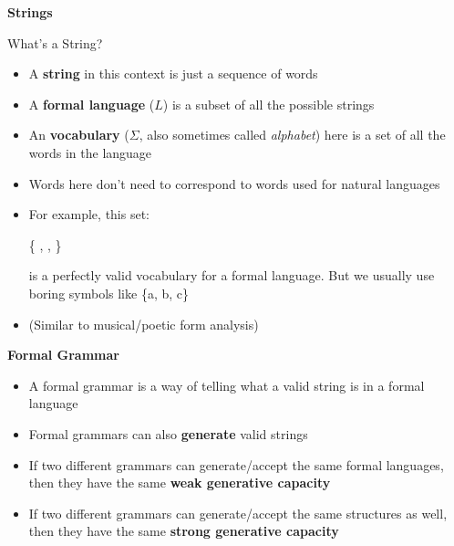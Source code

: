 \documentclass{beamer}
\newcommand{\pagestepalt}[2]{
  \begin{frame}[t]
    \begin{minipage}[t][0.26\textheight][t]{\textwidth}
      \begin{center}
        \huge
        \textbf{#1}
      \end{center}
    \end{minipage}
    
    \begin{minipage}[t][0.7\textheight][c]{\textwidth}
      #2
    \end{minipage}
  \end{frame}
}
\begin{document}
\pagestepalt{Strings}{
  \vspace{-1cm}
\begin{block}{What's a String?}
\begin{itemize}
	\item A \textbf{string} in this context is just a sequence of words
	\pause
	\item A \textbf{formal language} ($L$) is a subset of all the possible strings
	\pause
	\item An \textbf{vocabulary} ($\Sigma$, also sometimes called \textit{alphabet}) here is a set of all the words in the language
	\pause
	\item Words here don't need to correspond to words used for natural languages
	\pause
	\item For example, this set:\\
	\begin{center}
	{\LARGE \{ \Smiley[][cyan], \Springtree, \Snowman \}}\\
	\end{center}
	is a perfectly valid vocabulary for a formal language. \pause But we usually use boring symbols like \{a, b, c\}
	\pause
	\item {\scriptsize (Similar to musical/poetic form analysis)}
\end{itemize}
\end{block}
}


\pagestepalt{Formal Grammar}{
\begin{block}{}
\begin{itemize}
	\item A formal grammar is a way of telling what a valid string is in a formal language
	\item Formal grammars can also \textbf{generate} valid strings
	\pause
	\item If two different grammars can generate/accept the same formal languages, then they have the same \textbf{weak generative capacity}
	\pause
	\item If two different grammars can generate/accept the same structures as well, then they have the same \textbf{strong generative capacity}
\end{itemize}
\end{block}
}
\end{document}
